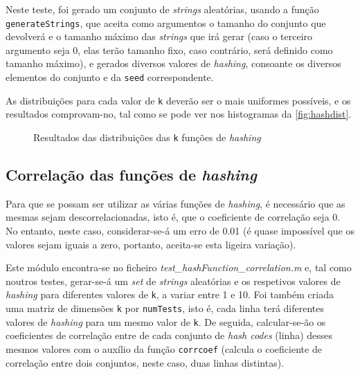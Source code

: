 \documentclass[a4paper,11pt,openright,oneside]{report}
\begin{document}
Neste teste, foi gerado um conjunto de \textit{strings} aleatórias, usando a função \texttt{generateStrings}, que aceita como argumentos o tamanho do conjunto que devolverá e o tamanho máximo das \textit{strings} que irá gerar (caso o terceiro argumento seja 0, elas terão tamanho fixo, caso contrário, será definido como tamanho máximo), e gerados diversos valores de \textit{hashing}, consoante os diversos elementos do conjunto e da \texttt{seed} correspondente.

As distribuições para cada valor de \texttt{k} deverão ser o mais uniformes possíveis, e os resultados comprovam-no, tal como se pode ver nos histogramas da \autoref{fig:hashdist}.

\begin{figure}[ht]	
\center
{}
\caption{Resultados das distribuições das \texttt{k} funções de \textit{hashing}}
\label{fig:hashdist}
\end{figure}

\subsection{Correlação das funções de \textit{hashing}}
\label{subsec.hashcorr}

Para que se possam ser utilizar as várias funções de \textit{hashing}, é necessário que as mesmas sejam descorrelacionadas, isto é, que o coeficiente de correlação seja 0. No entanto, neste caso, considerar-se-á um erro de 0.01 (é quase impossível que os valores sejam iguais a zero, portanto, aceita-se esta ligeira variação).

Este módulo encontra-se no ficheiro \textit{test\_hashFunction\_correlation.m} e, tal como noutros testes, gerar-se-á um \textit{set} de \textit{strings} aleatórias e os respetivos valores de \textit{hashing} para diferentes valores de \texttt{k}, a variar entre 1 e 10. Foi também criada uma matriz de dimensões \texttt{k} por \texttt{numTests}, isto é, cada linha terá diferentes valores de \textit{hashing} para um mesmo valor de \texttt{k}. De seguida, calcular-se-ão os coeficientes de correlação entre de cada conjunto de \textit{hash codes} (linha) desses mesmos valores com o auxílio da função \texttt{corrcoef} (calcula o coeficiente de correlação entre dois conjuntos, neste caso, duas linhas distintas).
\end{document}
